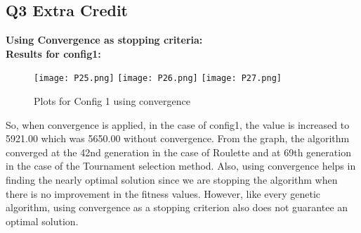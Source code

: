 \documentclass{article}
\begin{document}
{{{{\subsection*{\textbf{Q3 Extra Credit}}
\textbf{Using Convergence as stopping criteria: }\\
\textbf{Results for config1: }\\
\begin{figure}[h]
\centering
{
\texttt{[image: P25.png]}
}
{
\texttt{[image: P26.png]}
}
{
\texttt{[image: P27.png]}
}
\caption{Plots for Config 1 using convergence}
\label{}
\end{figure}
\begin{table}[H]
\centering
{}
\caption{Results at Pstop} 
\end{table} 

\begin{table}[H]
\centering
{}
\caption{Best Individual across all generations} 
\end{table} 
So, when convergence is applied, in the case of config1, the value is increased to 5921.00 which was 5650.00 without convergence. From the graph, the algorithm converged at the 42nd generation in the case of Roulette and at 69th generation in the case of the Tournament selection method. Also, using convergence helps in finding the nearly optimal solution since we are stopping the algorithm when there is no improvement in the fitness values. However, like every genetic algorithm, using convergence as a stopping criterion also does not guarantee an optimal solution.\\

}}}}
\end{document}
